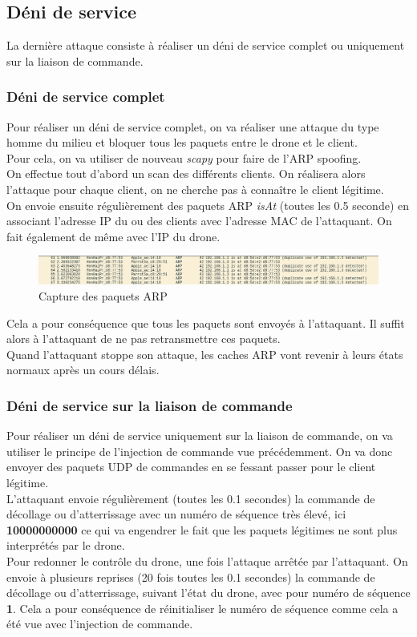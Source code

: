 \subsection{Déni de service}
La dernière attaque consiste à réaliser un déni de service complet ou uniquement sur la liaison de commande.

\subsubsection{Déni de service complet}
Pour réaliser un déni de service complet, on va réaliser une attaque du type homme du milieu et bloquer tous les paquets entre le drone et le client.\\
Pour cela, on va utiliser de nouveau \textit{scapy} pour faire de l'ARP spoofing.\\
On effectue tout d'abord un scan des différents clients. On réalisera alors l'attaque pour chaque client, on ne cherche pas à connaître le client légitime.\\
On envoie ensuite régulièrement des paquets ARP \textit{isAt} (toutes les 0.5 seconde) en associant l'adresse IP du ou des clients avec l'adresse MAC de l'attaquant. On fait également de même avec l'IP du drone.

\begin{figure}[H]
  \centering
  \includegraphics[scale=0.45]{images/arp.png}
  \caption{Capture des paquets ARP}
\end{figure}

Cela a pour conséquence que tous les paquets sont envoyés à l'attaquant. Il suffit alors à l'attaquant de ne pas retransmettre ces paquets.\\
Quand l'attaquant stoppe son attaque, les caches ARP vont revenir à leurs états normaux après un cours délais.

\subsubsection{Déni de service sur la liaison de commande}
Pour réaliser un déni de service uniquement sur la liaison de commande, on va utiliser le principe de l'injection de commande vue précédemment. On va donc envoyer des paquets UDP de commandes en se fessant passer pour le client légitime.\\
L'attaquant envoie régulièrement (toutes les 0.1 secondes) la commande de décollage ou d'atterrissage avec un numéro de séquence très élevé, ici \textbf{10000000000} ce qui va engendrer le fait que les paquets légitimes ne sont plus interprétés par le drone.\\
Pour redonner le contrôle du drone, une fois l'attaque arrêtée par l'attaquant. On envoie à plusieurs reprises (20 fois toutes les 0.1 secondes) la commande de décollage ou d'atterrissage, suivant l'état du drone, avec pour numéro de séquence \textbf{1}. Cela a pour conséquence de réinitialiser le numéro de séquence comme cela a été vue avec l'injection de commande.
